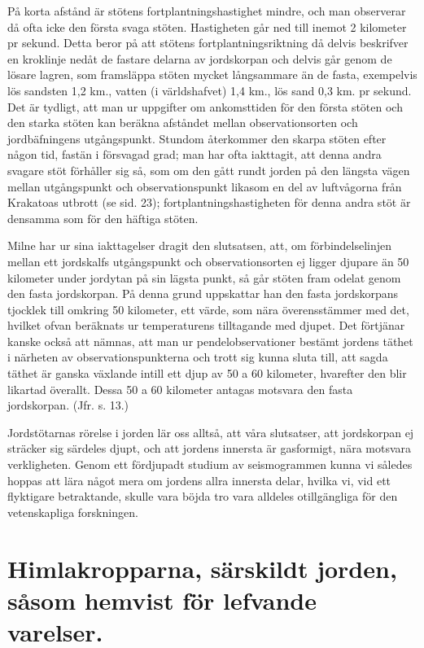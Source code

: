 \documentclass[a4paper, 12pt, oneside, swedish]{article}
\begin{document}
På korta afstånd är stötens fortplantningshastighet mindre, och man observerar då ofta icke den första svaga stöten. Hastigheten går ned till inemot 2 kilometer pr sekund. Detta beror på att stötens fortplantningsriktning då delvis beskrifver en kroklinje nedåt de fastare delarna av jordskorpan och delvis går genom de lösare lagren, som framsläppa stöten mycket långsammare än de fasta, exempelvis lös sandsten 1,2 km., vatten (i världshafvet) 1,4 km., lös sand 0,3 km. pr sekund. Det är tydligt, att man ur uppgifter om ankomsttiden för den första stöten och den starka stöten kan beräkna afståndet mellan observationsorten och jordbäfningens utgångspunkt. Stundom återkommer den skarpa stöten efter någon tid, fastän i försvagad grad; man har ofta iakttagit, att denna andra svagare stöt förhåller sig så, som om den gått rundt jorden på den längsta vägen mellan utgångspunkt och observationspunkt likasom en del av luftvågorna från Krakatoas utbrott (se sid. 23); fortplantningshastigheten för denna andra stöt är densamma som för den häftiga stöten.

Milne har ur sina iakttagelser dragit den slutsatsen, att, om förbindelselinjen mellan ett jordskalfs utgångspunkt och observationsorten ej ligger djupare än 50 kilometer under jordytan på sin lägsta punkt, så går stöten fram odelat genom den fasta jordskorpan. På denna grund uppskattar han den fasta jordskorpans tjocklek till omkring 50 kilometer, ett värde, som nära överensstämmer med det, hvilket ofvan beräknats ur temperaturens tilltagande med djupet. Det förtjänar kanske också att nämnas, att man ur pendelobservationer bestämt jordens täthet i närheten av observationspunkterna och trott sig kunna sluta till, att sagda täthet är ganska växlande intill ett djup av 50 a 60 kilometer, hvarefter den blir likartad överallt. Dessa 50 a 60 kilometer antagas motsvara den fasta jordskorpan. (Jfr. s. 13.)

Jordstötarnas rörelse i jorden lär oss alltså, att våra slutsatser, att jordskorpan ej sträcker sig särdeles djupt, och att jordens innersta är gasformigt, nära motsvara verkligheten. Genom ett fördjupadt studium av seismogrammen kunna vi således hoppas att lära något mera om jordens allra innersta delar, hvilka vi, vid ett flyktigare betraktande, skulle vara böjda tro vara alldeles otillgängliga för den vetenskapliga forskningen.
\clearpage
\section{Himlakropparna, särskildt jorden, såsom hemvist för lefvande varelser.}
\end{document}
